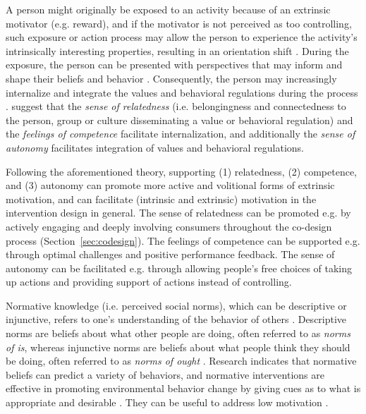 \documentclass[a4paper]{article}
\begin{document}
A person might originally be exposed to an activity because of an extrinsic motivator (e.g. reward), and if the motivator is not perceived as too controlling, such exposure or action process may allow the person to experience the activity's intrinsically interesting properties, resulting in an orientation shift \citep{Ryan2000}. During the exposure, the person can be presented with perspectives that may inform and shape their beliefs and behavior \citep{Brynjarsdottir2012}. Consequently, the person may increasingly internalize and integrate the values and behavioral regulations during the process \citep{Ryan2000}. \citet{Ryan2000} suggest that the \textit{sense of relatedness} (i.e. belongingness and connectedness to the person, group or culture disseminating a value or behavioral regulation) and the \textit{feelings of competence} facilitate internalization, and additionally the \textit{sense of autonomy} facilitates integration of values and behavioral regulations. 

Following the aforementioned theory, supporting (1) relatedness, (2) competence, and (3) autonomy can promote more active and volitional forms of extrinsic motivation, and can facilitate (intrinsic and extrinsic) motivation in the intervention design in general. The sense of relatedness can be promoted e.g. by actively engaging and deeply involving consumers throughout the co-design process (Section~\ref{sec:codesign}). The feelings of competence can be supported e.g. through optimal challenges \citep{Guadagnoli2004} and positive performance feedback. The 
sense of autonomy can be facilitated e.g. through allowing people's free choices of taking up actions and providing support of actions instead of controlling. 

Normative knowledge (i.e. perceived social norms), which can be descriptive or injunctive, refers to one's understanding of the behavior of others \citep{Schultz2002}. Descriptive norms are beliefs about what other people are doing, often referred to as \textit{norms of is}, whereas injunctive norms are beliefs about what people think they should be doing, often referred to as \textit{norms of ought} \citep{Schultz2002}. Research indicates that normative beliefs can predict a variety of behaviors, and normative interventions are effective in promoting environmental behavior change by giving cues as to what is appropriate and desirable \citep{Cialdini2004,Allcott2011,Schultz2002, Petkov2011,Delmas2013}. They can be useful to address low motivation \citep{schultz2015strategies}. 
\end{document}
